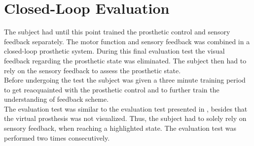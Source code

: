 

\section{Closed-Loop Evaluation}

The subject had until this point trained the prosthetic control and sensory feedback separately. The motor function and sensory feedback was combined in a closed-loop prosthetic system. During this final evaluation test the visual feedback regarding the prosthetic state was eliminated. The subject then had to rely on the sensory feedback to assess the prosthetic state. \\
Before undergoing the test the subject was given a three minute training period to get reacquainted with the prosthetic control and to further train the understanding of feedback scheme.  \\
The evaluation test was similar to the evaluation test presented in , besides that the virtual prosthesis was not visualized. Thus, the subject had to solely rely on sensory feedback, when reaching a highlighted state. The evaluation test was performed two times consecutively.
